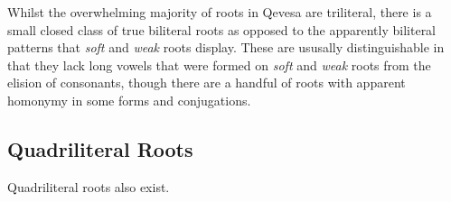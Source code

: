 \documentclass[grammar]{subfiles}
\begin{document}
  Whilst the overwhelming majority of roots in Qevesa are triliteral, there is
  a small closed class of true biliteral roots as opposed to the apparently
  biliteral patterns that \emph{soft} and \emph{weak} roots display.  These are
  ususally distinguishable in that they lack long vowels that were formed on
  \emph{soft} and \emph{weak} roots from the elision of consonants, though
  there are a handful of roots with apparent homonymy in some forms and
  conjugations.

  \subsection{Quadriliteral Roots}
  \label{ssec:vm_quadriliteral_roots}

  Quadriliteral roots also exist.

  \ToBeWritten
\end{document}
